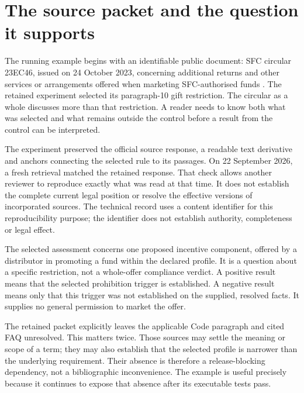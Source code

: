 \section{The source packet and the question it supports}
\label{merge:M02:00}

\label{sec:circular-packet}
The running example begins with an identifiable public document: SFC circular
23EC46, issued on 24 October 2023, concerning additional returns and other
services or arrangements offered when marketing SFC-authorised funds
\citep{sfcmarketing}. The retained experiment selected its paragraph-10 gift
restriction. The circular as a whole discusses more than that restriction. A
reader needs to know both what was selected and what remains outside the control
before a result from the control can be interpreted.

The experiment preserved the official source response, a readable text
derivative and anchors connecting the selected rule to its passages. On
22 September 2026, a fresh retrieval matched the retained response. That check
allows another reviewer to reproduce exactly what was read at that time. It
does not establish the complete current legal position or resolve the effective
versions of incorporated sources. The technical record uses a content identifier
for this reproducibility purpose; the identifier does not establish authority,
completeness or legal effect.


The selected assessment concerns one proposed incentive component, offered by a
distributor in promoting a fund within the declared profile. It is a question
about a specific restriction, not a whole-offer compliance verdict. A positive
result means that the selected prohibition trigger is established. A negative
result means only that this trigger was not established on the supplied,
resolved facts. It supplies no general permission to market the offer.

The retained packet explicitly leaves the applicable Code paragraph and cited
FAQ unresolved. This matters twice. Those sources may settle the meaning or
scope of a term; they may also establish that the selected profile is narrower
than the underlying requirement. Their absence is therefore a release-blocking
dependency, not a bibliographic inconvenience. The example is useful precisely
because it continues to expose that absence after its executable tests pass.

